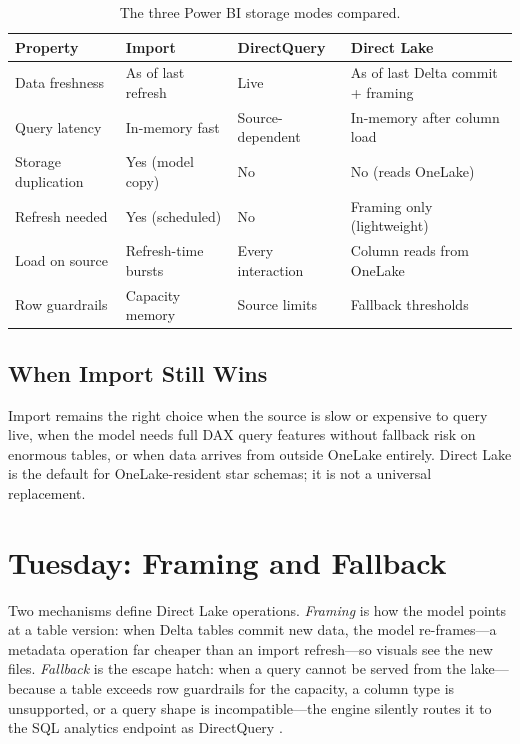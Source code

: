 \begin{table}[H]
\centering
\small
\begin{tabular}{@{}p{3.0cm}p{3.6cm}p{3.6cm}p{3.6cm}@{}}
\toprule
\textbf{Property} & \textbf{Import} & \textbf{DirectQuery} & \textbf{Direct Lake} \\
\midrule
Data freshness & As of last refresh & Live & As of last Delta commit + framing \\
Query latency & In-memory fast & Source-dependent & In-memory after column load \\
Storage duplication & Yes (model copy) & No & No (reads OneLake) \\
Refresh needed & Yes (scheduled) & No & Framing only (lightweight) \\
Load on source & Refresh-time bursts & Every interaction & Column reads from OneLake \\
Row guardrails & Capacity memory & Source limits & Fallback thresholds \\
\bottomrule
\end{tabular}
\caption{The three Power BI storage modes compared.}
\label{tab:chapter8-modes}
\end{table}

\subsection{When Import Still Wins}
Import remains the right choice when the source is slow or expensive to query live, when the model needs full DAX query features without fallback risk on enormous tables, or when data arrives from outside OneLake entirely. Direct Lake is the default for OneLake-resident star schemas; it is not a universal replacement.

\section{Tuesday: Framing and Fallback}
Two mechanisms define Direct Lake operations. \emph{Framing} is how the model points at a table version: when Delta tables commit new data, the model re-frames---a metadata operation far cheaper than an import refresh---so visuals see the new files. \emph{Fallback} is the escape hatch: when a query cannot be served from the lake---because a table exceeds row guardrails for the capacity, a column type is unsupported, or a query shape is incompatible---the engine silently routes it to the SQL analytics endpoint as DirectQuery \cite{microsoftDirectLake,microsoftFabricDirectLakeFallback}.

